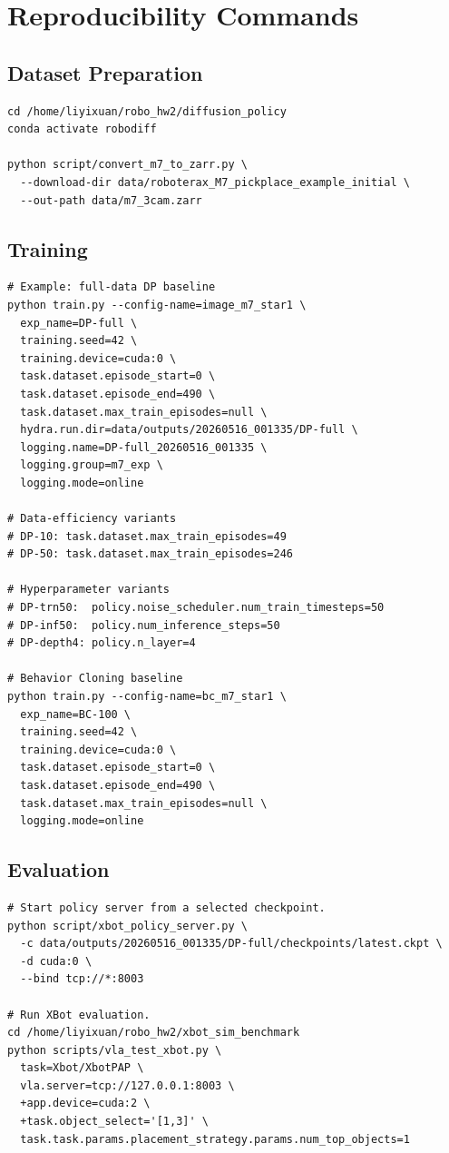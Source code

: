 \documentclass[UTF8]{ctexart}
\begin{document}
\section{Reproducibility Commands}

\subsection{Dataset Preparation}

\begin{lstlisting}
cd /home/liyixuan/robo_hw2/diffusion_policy
conda activate robodiff

python script/convert_m7_to_zarr.py \
  --download-dir data/roboterax_M7_pickplace_example_initial \
  --out-path data/m7_3cam.zarr
\end{lstlisting}

\subsection{Training}

\begin{lstlisting}
# Example: full-data DP baseline
python train.py --config-name=image_m7_star1 \
  exp_name=DP-full \
  training.seed=42 \
  training.device=cuda:0 \
  task.dataset.episode_start=0 \
  task.dataset.episode_end=490 \
  task.dataset.max_train_episodes=null \
  hydra.run.dir=data/outputs/20260516_001335/DP-full \
  logging.name=DP-full_20260516_001335 \
  logging.group=m7_exp \
  logging.mode=online

# Data-efficiency variants
# DP-10: task.dataset.max_train_episodes=49
# DP-50: task.dataset.max_train_episodes=246

# Hyperparameter variants
# DP-trn50:  policy.noise_scheduler.num_train_timesteps=50
# DP-inf50:  policy.num_inference_steps=50
# DP-depth4: policy.n_layer=4

# Behavior Cloning baseline
python train.py --config-name=bc_m7_star1 \
  exp_name=BC-100 \
  training.seed=42 \
  training.device=cuda:0 \
  task.dataset.episode_start=0 \
  task.dataset.episode_end=490 \
  task.dataset.max_train_episodes=null \
  logging.mode=online
\end{lstlisting}

\subsection{Evaluation}

\begin{lstlisting}
# Start policy server from a selected checkpoint.
python script/xbot_policy_server.py \
  -c data/outputs/20260516_001335/DP-full/checkpoints/latest.ckpt \
  -d cuda:0 \
  --bind tcp://*:8003

# Run XBot evaluation.
cd /home/liyixuan/robo_hw2/xbot_sim_benchmark
python scripts/vla_test_xbot.py \
  task=Xbot/XbotPAP \
  vla.server=tcp://127.0.0.1:8003 \
  +app.device=cuda:2 \
  +task.object_select='[1,3]' \
  task.task.params.placement_strategy.params.num_top_objects=1
\end{lstlisting}
\end{document}
